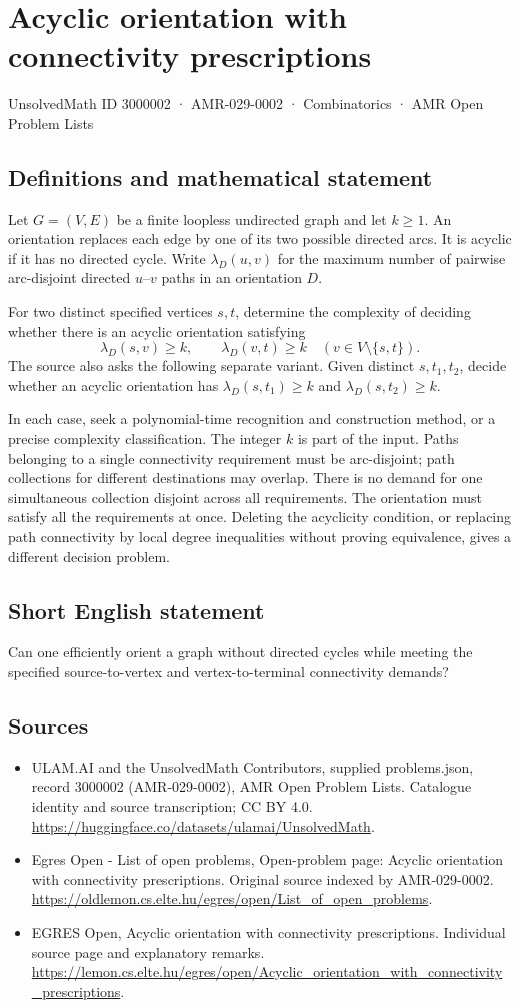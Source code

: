 \documentclass[11pt,a4paper]{article}
\begin{document}
\section*{Acyclic orientation with connectivity prescriptions}\label{3000002}
{\small UnsolvedMath ID 3000002 · AMR-029-0002 · Combinatorics · AMR Open Problem Lists}
\subsection{Definitions and mathematical statement}
Let $G=(V,E)$ be a finite loopless undirected graph and let $k\ge1$.
An orientation replaces each edge by one of its two possible directed
arcs. It is acyclic if it has no directed cycle. Write $\lambda_D(u,v)$
for the maximum number of pairwise arc-disjoint directed $u$--$v$ paths
in an orientation $D$.

For two distinct specified vertices $s,t$, determine the complexity of
deciding whether there is an acyclic orientation satisfying
\[
 \lambda_D(s,v)\ge k,\qquad \lambda_D(v,t)\ge k
                 \quad(v\in V\setminus\{s,t\}).
\]
The source also asks the following separate variant. Given distinct
$s,t_1,t_2$, decide whether an acyclic orientation has
$\lambda_D(s,t_1)\ge k$ and $\lambda_D(s,t_2)\ge k$.

In each case, seek a polynomial-time recognition and construction method,
or a precise complexity classification. The integer $k$ is part of the
input. Paths belonging to a single connectivity requirement must be
arc-disjoint; path collections for different destinations may overlap.
There is no demand for one simultaneous collection disjoint across all
requirements. The orientation must satisfy all the requirements at once.
Deleting the acyclicity condition, or replacing path connectivity by
local degree inequalities without proving equivalence, gives a different
decision problem.
\subsection{Short English statement}
Can one efficiently orient a graph without directed cycles while
meeting the specified source-to-vertex and vertex-to-terminal connectivity demands?
\subsection{Sources}
\begin{itemize}
\item[S1] ULAM.AI and the UnsolvedMath Contributors, supplied problems.json, record 3000002 (AMR-029-0002), AMR Open Problem Lists. Catalogue identity and source transcription; CC BY 4.0.
\url{https://huggingface.co/datasets/ulamai/UnsolvedMath}.
\item[S2] Egres Open - List of open problems, Open-problem page: Acyclic orientation with connectivity prescriptions. Original source indexed by AMR-029-0002.
\url{https://oldlemon.cs.elte.hu/egres/open/List_of_open_problems}.
\item[S3] EGRES Open, Acyclic orientation with connectivity prescriptions. Individual source page and explanatory remarks.
\url{https://lemon.cs.elte.hu/egres/open/Acyclic_orientation_with_connectivity_prescriptions}.
\end{itemize}
\end{document}
